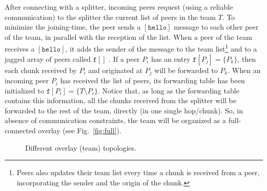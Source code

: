 

\label{sec:joining}

After connecting with a splitter, incoming peers request (using a
reliable communication) to the splitter the current list of peers in
the team $T$. To minimize the \gls{joining-time}, the peer sends a
$[\mathtt{hello}]$ message to each other peer of the team, in parallel
with the reception of the list. When a peer of the team receives a
$[\mathtt{hello}]$, it adds the sender of the message to the team
list\footnote{Peers also updates their team list every time a chunk is
  received from a peer, incorporating the sender and the origin of the
  chunk.} and to a jagged array of peers called $\mathtt{f}[]$
. If a peer $P_i$ has an entry
$\mathtt{f}[P_j]=\{P_k\}$, then each chunk received by $P_i$ and
originated at $P_j$ will be forwarded to $P_k$. When an incoming peer
$P_i$ has received the list of peers, its forwarding table has been
initialized to $\mathtt{f}[P_i]=\{T\setminus P_i\}$. Notice
that, as long as the forwarding table contains this information, all
the chunks received from the splitter will be forwarded to the rest of
the team, directly (in one single hop/chunk). So, in absence of
communication constraints, the team will be organized as a
full-connected overlay (see Fig.~\ref{fig:full}).

\begin{figure}
  \centering
  \caption{Different overlay (team) topologies.}
  \label{fig:three_topos}
\end{figure}%
  


